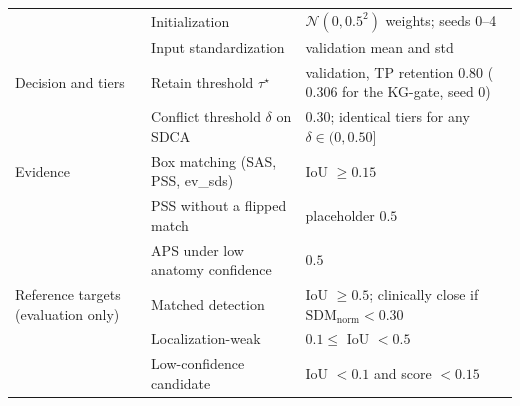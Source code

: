 \begin{table}[htbp]
{\begin{tabular}{@{}>{\raggedright\arraybackslash}p{}>{\raggedright\arraybackslash}p{}>{\raggedright\arraybackslash}p{}@{}}
 & Initialization & $\mathcal{N}(0,0.5^2)$ weights; seeds 0--4 \\
 & Input standardization & validation mean and std \\
\midrule
Decision and tiers & Retain threshold $\tau^\star$ & validation, TP retention 0.80 ($0.306$ for the KG-gate, seed 0) \\
 & Conflict threshold $\delta$ on SDCA & $0.30$; identical tiers for any $\delta\in(0,0.50]$ \\
\midrule
Evidence & Box matching (SAS, PSS, ev\_sds) & IoU $\geq 0.15$ \\
 & PSS without a flipped match & placeholder $0.5$ \\
 & APS under low anatomy confidence & $0.5$ \\
\midrule
Reference targets (evaluation only) & Matched detection & IoU $\geq 0.5$; clinically close if $\mathrm{SDM}_{\mathrm{norm}}<0.30$ \\
 & Localization-weak & $0.1\leq$ IoU $<0.5$ \\
 & Low-confidence candidate & IoU $<0.1$ and score $<0.15$ \\
\bottomrule
\end{tabular}}
\end{table}
